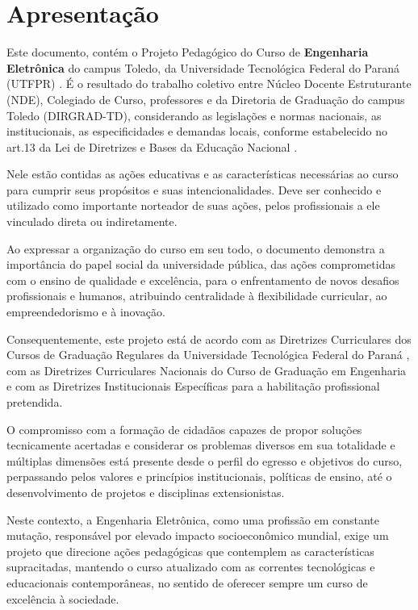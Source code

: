 \chapter*{Apresentação}

Este documento, contém o Projeto Pedagógico do Curso de \textbf{Engenharia Eletrônica}  do campus Toledo, da Universidade Tecnológica Federal do Paraná (UTFPR) \cite{abertura, reconhecimento, renova1, renova2, renova3}. É o resultado do trabalho coletivo entre Núcleo Docente Estruturante (NDE), Colegiado de Curso, professores e da Diretoria de Graduação do campus Toledo (DIRGRAD-TD), considerando as legislações e normas nacionais, as institucionais, as especificidades e demandas locais, conforme estabelecido no art.13\textordmasculine{} da Lei de Diretrizes e Bases da Educação Nacional \cite{Lei:9394:1996}.

Nele estão contidas as ações educativas e as características necessárias ao curso para cumprir seus propósitos e suas intencionalidades. Deve ser conhecido e utilizado como importante norteador de suas ações, pelos profissionais a ele vinculado direta ou indiretamente.

Ao expressar a organização do curso em seu todo, o documento demonstra a importância do papel social da universidade pública, das ações comprometidas com o ensino de qualidade e excelência, para o enfrentamento de novos desafios profissionais e humanos, atribuindo centralidade à flexibilidade curricular, ao empreendedorismo e à inovação.

Consequentemente, este projeto está de acordo com as Diretrizes Curriculares dos Cursos de Graduação Regulares da Universidade Tecnológica Federal do Paraná \cite{cogep90}, com as Diretrizes Curriculares Nacionais do Curso de Graduação em Engenharia \cite{dcneng} e com as Diretrizes Institucionais Específicas para a habilitação profissional pretendida.

O compromisso com a formação de cidadãos capazes de propor soluções tecnicamente acertadas e considerar os problemas diversos em sua totalidade e múltiplas dimensões está presente desde o perfil do egresso e objetivos do curso, perpassando pelos valores e princípios institucionais, políticas de ensino, até o desenvolvimento de projetos e disciplinas extensionistas.

Neste contexto, a Engenharia Eletrônica, como uma profissão em constante mutação, responsável por elevado impacto socioeconômico mundial, exige um projeto que direcione ações pedagógicas que contemplem as características supracitadas, mantendo o curso atualizado com as correntes tecnológicas e educacionais contemporâneas, no sentido de oferecer sempre um curso de excelência à sociedade.